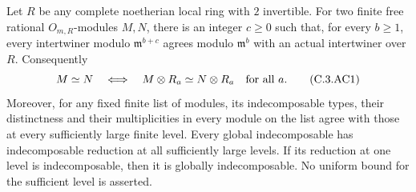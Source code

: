 \begin{lemma}
\label{C:complete_Hom_detection}
Let $R$ be any complete noetherian local ring with $2$ invertible.
For two finite free rational $O_{m,R}$-modules $M,N$, there is an
integer $c\geq0$ such that, for every $b\geq1$, every intertwiner
modulo $\mathfrak m^{b+c}$ agrees modulo $\mathfrak m^b$ with an
actual intertwiner over $R$.  Consequently
\[
 M\simeq N\quad\Longleftrightarrow\quad
 M\otimes R_a\simeq N\otimes R_a\quad\hbox{for all }a.
                                                               \tag{C.3.AC1}
\]
Moreover, for any fixed finite list of modules, its indecomposable
types, their distinctness and their multiplicities in every module
on the list agree with those at every sufficiently large finite
level.  Every global indecomposable has indecomposable reduction
at all sufficiently large levels.  If its reduction at one level
is indecomposable, then it is globally indecomposable.
No uniform bound for the sufficient level is asserted.
\end{lemma}
